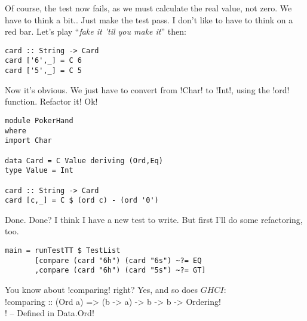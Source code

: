 \failure Of course, the test now fails, as we must calculate the real value, not zero. We have to think a bit.. 
\lhN \failure Just make the test pass. I don't like to have to think on a red bar.
\lhA \failure Let's play ``\emph{fake it 'til you make it}'' then:
\begin{lstlisting}[frame=single]
card :: String -> Card
card ['6',_] = C 6
card ['5',_] = C 5 
\end{lstlisting}
\success Now it's obvious.
\lhN \success We just have to convert from \il!Char! to \il!Int!, using the \il!ord! function. Refactor it!
\lhA \success Ok!
\begin{lstlisting}[frame=single]
module PokerHand
where
import Char

data Card = C Value deriving (Ord,Eq)
type Value = Int

card :: String -> Card
card [c,_] = C $ (ord c) - (ord '0')
\end{lstlisting} %
\success Done.
\lhN Done? I think I have a new test to write. But first I'll do some refactoring, too.
\begin{lstlisting}[frame=single]
main = runTestTT $ TestList 
       [compare (card "6h") (card "6s") ~?= EQ
       ,compare (card "6h") (card "5s") ~?= GT]
\end{lstlisting} %
You know about \il!comparing! right?
\lhA Yes, and so does $GHCI$: \\

\il!comparing :: (Ord a) => (b -> a) -> b -> b -> Ordering! \\
\il! -- Defined in Data.Ord! \\


